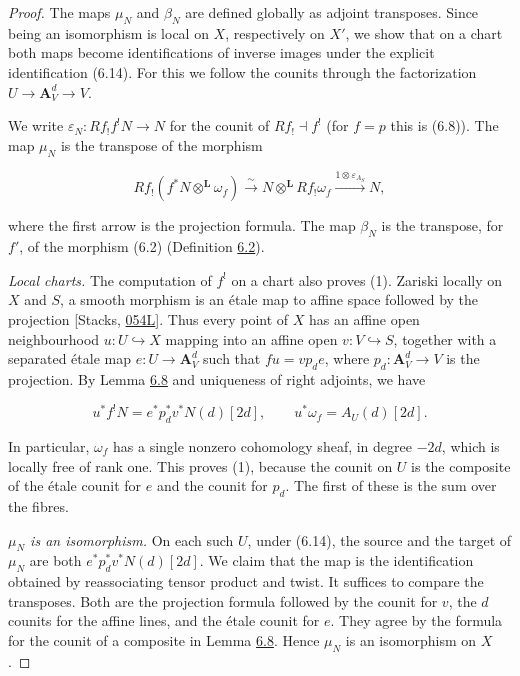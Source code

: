 \documentclass[11pt]{article}
\begin{document}
\begin{proof}[{Proof}]\label{bp543}%
The maps \(\mu_N\) and \(\beta_N\) are defined globally as adjoint transposes. Since being an isomorphism is local on \(X\), respectively on \(X'\), we show that on a chart both maps become identifications of inverse images under the explicit identification (6.14). For this we follow the counits through the factorization \(U\to\mathbf A^d_V\to V\).

We write \(\varepsilon_N:Rf_!f^!N\to N\) for the counit of \(Rf_!\dashv f^!\) (for \(f=p\) this is (6.8)). The map \(\mu_N\) is the transpose of the morphism

\[
Rf_!(f^*N\otimes^{\mathbf L}\omega_f)
\xrightarrow{\ \sim\ }
N\otimes^{\mathbf L}Rf_!\omega_f
\xrightarrow{1\otimes\varepsilon_{A_S}}N ,
\]

where the first arrow is the projection formula. The map \(\beta_N\) is the transpose, for \(f'\), of the morphism (6.2) (Definition \hyperref[bp519]{6.2}).

\emph{Local charts.} The computation of \(f^!\) on a chart also proves (1). Zariski locally on \(X\) and \(S\), a smooth morphism is an étale map to affine space followed by the projection [Stacks, \href{https://stacks.math.columbia.edu/tag/054L}{054L}]. Thus every point of \(X\) has an affine open neighbourhood \(u:U\hookrightarrow X\) mapping into an affine open \(v:V\hookrightarrow S\), together with a separated étale map \(e:U\to\mathbf A^d_V\) such that \(fu=vp_de\), where \(p_d:\mathbf A^d_V\to V\) is the projection. By Lemma \hyperref[bp538]{6.8} and uniqueness of right adjoints, we have

\[
u^*f^!N=e^*p_d^*v^*N(d)[2d],\qquad
u^*\omega_f=A_U(d)[2d].
\tag{6.14}
\]

In particular, \(\omega_f\) has a single nonzero cohomology sheaf, in degree \(-2d\), which is locally free of rank one. This proves (1), because the counit on \(U\) is the composite of the étale counit for \(e\) and the counit for \(p_d\). The first of these is the sum over the fibres.

\emph{\(\mu_N\) is an isomorphism.} On each such \(U\), under (6.14), the source and the target of \(\mu_N\) are both \(e^*p_d^*v^*N(d)[2d]\). We claim that the map is the identification obtained by reassociating tensor product and twist. It suffices to compare the transposes. Both are the projection formula followed by the counit for \(v\), the \(d\) counits for the affine lines, and the étale counit for \(e\). They agree by the formula for the counit of a composite in Lemma \hyperref[bp538]{6.8}. Hence \(\mu_N\) is an isomorphism on \(X\).


\end{proof}
\end{document}
